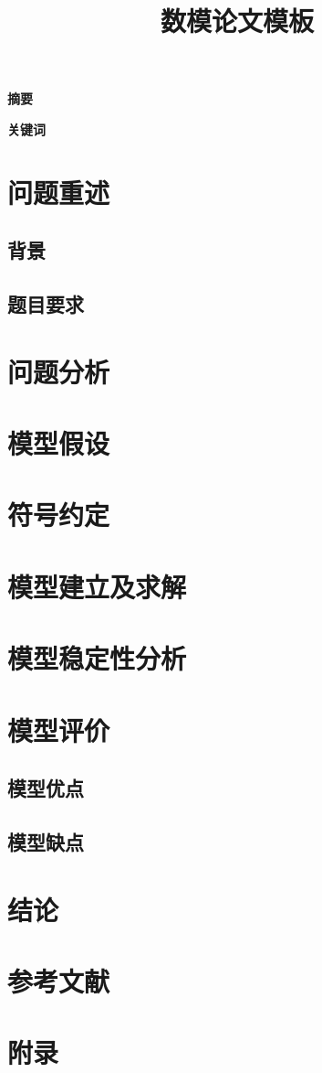 \documentclass{ctexart}
\title{\textbf{数模论文模板}}
\begin{document}
	\maketitle
\begin{center}
	\large\bfseries 摘要
\end{center}





\textbf{关键词}

\tableofcontents

\section{问题重述}
\subsection{背景}
\subsection{题目要求}
\section{问题分析}
\section{模型假设}
\section{符号约定}
\section{模型建立及求解}
\section{模型稳定性分析}
\section{模型评价}
\subsection{模型优点}
\subsection{模型缺点}
\section{结论}
\section{参考文献}
\section{附录}
\end{document}
